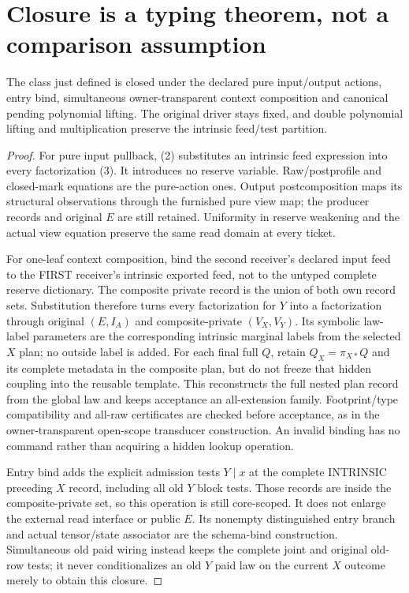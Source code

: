 \documentclass[11pt]{article}
\begin{document}
\section{Closure is a typing theorem, not a comparison assumption}
\begin{theorem}
The class just defined is closed under the declared pure input/output actions, entry bind, simultaneous owner-transparent context composition and canonical pending polynomial lifting. The original driver stays fixed, and double polynomial lifting and multiplication preserve the intrinsic feed/test partition.
\end{theorem}
\begin{proof}
For pure input pullback, (2) substitutes an intrinsic feed expression into every factorization (3). It introduces no reserve variable. Raw/postprofile and closed-mark equations are the pure-action ones. Output postcomposition maps its structural observations through the furnished pure view map; the producer records and original $E$ are still retained. Uniformity in reserve weakening and the actual view equation preserve the same read domain at every ticket.

For one-leaf context composition, bind the second receiver's declared input feed to the FIRST receiver's intrinsic exported feed, not to the untyped complete reserve dictionary. The composite private record is the union of both own record sets. Substitution therefore turns every factorization for $Y$ into a factorization through original $(E,I_A)$ and composite-private $(V_X,V_Y)$. Its symbolic law-label parameters are the corresponding intrinsic marginal labels from the selected $X$ plan; no outside label is added. For each final full $Q$, retain $Q_X=\pi_{X*}Q$ and its complete metadata in the composite plan, but do not freeze that hidden coupling into the reusable template. This reconstructs the full nested plan record from the global law and keeps acceptance an all-extension family. Footprint/type compatibility and all-raw certificates are checked before acceptance, as in the owner-transparent open-scope transducer construction. An invalid binding has no command rather than acquiring a hidden lookup operation.

Entry bind adds the explicit admission tests $Y\mid x$ at the complete INTRINSIC preceding $X$ record, including all old $Y$ block tests. Those records are inside the composite-private set, so this operation is still core-scoped. It does not enlarge the external read interface or public $E$. Its nonempty distinguished entry branch and actual tensor/state associator are the schema-bind construction. Simultaneous old paid wiring instead keeps the complete joint and original old-row tests; it never conditionalizes an old $Y$ paid law on the current $X$ outcome merely to obtain this closure.


\end{proof}
\end{document}
